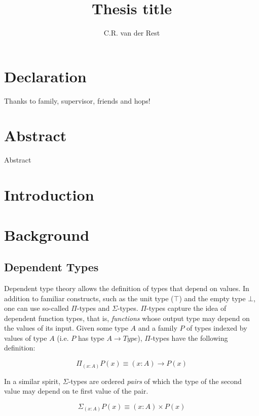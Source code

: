\documentclass[a4paper,msc,twosized=semi]{uustthesis}
\title{Thesis title}
\author{C.R. van der Rest}
\begin{document}
\maketitle

\frontmatter
\tableofcontents

\chapter{Declaration}
Thanks to family, supervisor, friends and hops!

\chapter{Abstract}
Abstract

\mainmatter

\chapter{Introduction}

\chapter{Background}
\section{Dependent Types}

    Dependent type theory allows the definition of types that depend 
    on values. In addition to familiar constructs, such as the unit 
    type ($\top$) and the empty type $\bot$, one can use so-called 
    $\Pi$-types and $\Sigma$-types. $\Pi$-types capture the idea of 
    dependent function types, that is, \textit{functions} whose output 
    type may depend on the values of its input. Given some type $A$ 
    and a family $P$ of types indexed by values of type $A$ (i.e. $P$ 
    has type $A \rightarrow Type$), $\Pi$-types have the following 
    definition: 

\begin{equation*}
\Pi_{(x : A)} P(x) \equiv (x : A) \rightarrow P(x) 
\end{equation*}

    In a similar spirit, $\Sigma$-types are ordered \textit{pairs} of 
    which the type of the second value may depend on te first value of 
    the pair. 

\begin{equation*}
\Sigma_{(x : A)} P(x) \equiv (x : A) \times P(x) 
\end{equation*}
\end{document}
